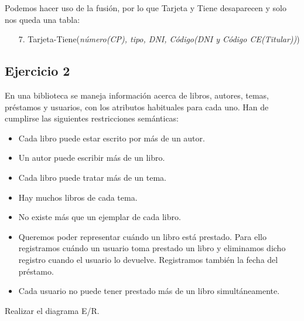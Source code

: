 Podemos hacer uso de la fusión, por lo que Tarjeta y Tiene desaparecen y solo nos queda una tabla:

\begin{itemize}
    \item[7. ] Tarjeta-Tiene(\textit{número(CP), tipo, DNI, Código(DNI y Código CE(Titular))})
\end{itemize}

\newpage

\subsection*{Ejercicio 2}

\noindent En una biblioteca se maneja información acerca de libros, autores, temas, préstamos y 
usuarios, con los atributos habituales para cada uno. Han de cumplirse las siguientes 
restricciones semánticas: 
 
\begin{itemize}
    \item Cada libro puede estar escrito por más de un autor.
    \item Un autor puede escribir más de un libro.
    \item Cada libro puede tratar más de un tema.
    \item Hay muchos libros de cada tema.
    \item No existe más que un ejemplar de cada libro.
    \item Queremos poder representar cuándo un libro está prestado. Para ello registramos cuándo un usuario toma prestado un libro y eliminamos dicho registro cuando el usuario lo devuelve. Registramos también la fecha del préstamo.
    \item Cada usuario no puede tener prestado más de un libro simultáneamente.
\end{itemize}

\noindent Realizar el diagrama E/R.

